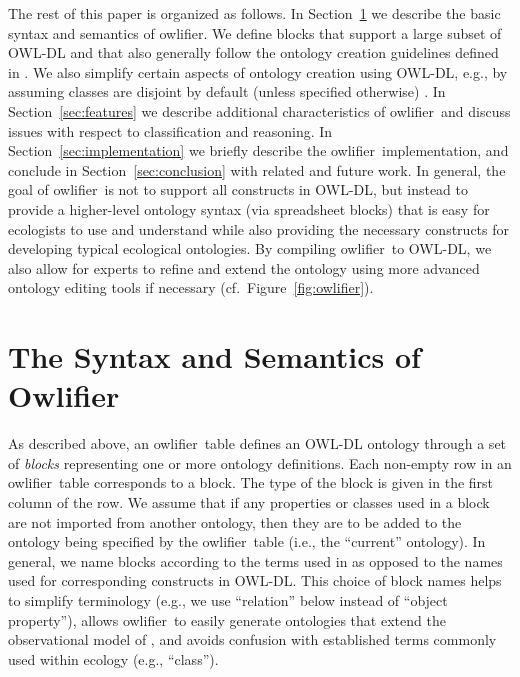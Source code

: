 \documentclass[5p,authoryear]{elsarticle}
\newcommand{\Owlifier}{\textsf{Owlifier}}
\newcommand{\owlifier}{\textsf{owlifier}}
\newcommand{\secref}[1]{Section~\ref{#1}}
\newcommand{\figref}[1]{Figure~\ref{#1}}
\begin{document}
The rest of this paper is organized as follows. In
\secref{sec:owlifier} we describe the basic syntax and semantics of
\owlifier. We define blocks that support a large subset of OWL-DL and
that also generally follow the ontology creation guidelines defined in
\citep{rector04:_owl_pizzas}. We also simplify certain aspects of
ontology creation using OWL-DL, e.g., by assuming classes are disjoint
by default (unless specified otherwise)
\citep{rector04:_owl_pizzas}. In \secref{sec:features} we describe
additional characteristics of \owlifier\ and discuss issues with
respect to classification and reasoning. In
\secref{sec:implementation} we briefly describe the \owlifier\
implementation, and conclude in \secref{sec:conclusion} with related
and future work. In general, the goal of \owlifier\ is not to support
all constructs in OWL-DL, but instead to provide a higher-level
ontology syntax (via spreadsheet blocks) that is easy for ecologists
to use and understand while also providing the necessary constructs
for developing typical ecological ontologies. By compiling \owlifier\
to OWL-DL, we also allow for experts to refine and extend the ontology
using more advanced ontology editing tools if necessary
(cf.~\figref{fig:owlifier}).



\section{The Syntax and Semantics of \Owlifier}
\label{sec:owlifier}

As described above, an \owlifier\ table defines an OWL-DL
\citep{smith04:_owl_web_ontol_languag_guide} ontology through a set of
\emph{blocks} representing one or more ontology definitions.  Each
non-empty row in an \owlifier\ table corresponds to a block. The type
of the block is given in the first column of the row. 
We assume that if any properties or classes used in a block are not
imported from another ontology, then they are to be added to the
ontology being specified by the \owlifier\ table (i.e., the
``current'' ontology). In general, we name blocks according to the
terms used in
\citep{bowers08:_concep_model_framew_for_expres,madin07:_ontol_for_descr_and_synth}
as opposed to the names used for corresponding constructs in
OWL-DL. This choice of block names helps to simplify terminology
(e.g., we use ``relation'' below instead of ``object property''),
allows \owlifier\ to easily generate ontologies that extend the
observational model of
\citep{bowers08:_concep_model_framew_for_expres,madin07:_ontol_for_descr_and_synth},
and avoids confusion with established terms commonly used within
ecology (e.g., ``class''). 
\end{document}
